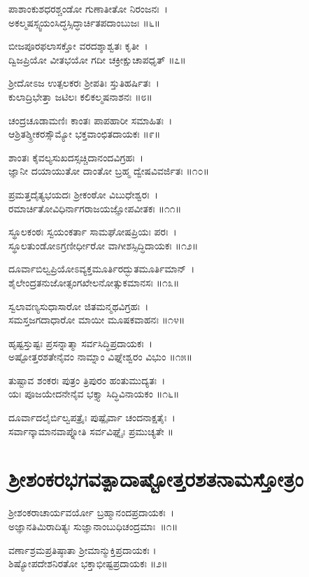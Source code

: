ಪಾಶಾಂಕುಶಧರಶ್ಚಂಡೋ ಗುಣಾತೀತೋ ನಿರಂಜನಃ~।\\
ಅಕಲ್ಮಷಸ್ಸ್ವಯಂಸಿದ್ಧಸ್ಸಿದ್ಧಾರ್ಚಿತಪದಾಂಬುಜಃ ॥೬॥

ಬೀಜಪೂರಫಲಾಸಕ್ತೋ ವರದಶ್ಶಾಶ್ವತಃ ಕೃತೀ~।\\
ದ್ವಿಜಪ್ರಿಯೋ ವೀತಭಯೋ ಗದೀ ಚಕ್ರೀಕ್ಷುಚಾಪಧೃತ್ ॥೭॥

ಶ್ರೀದೋಽಜ ಉತ್ಪಲಕರಃ ಶ್ರೀಪತಿಃ ಸ್ತುತಿಹರ್ಷಿತಃ~।\\
ಕುಲಾದ್ರಿಭೇತ್ತಾ ಜಟಿಲಃ ಕಲಿಕಲ್ಮಷನಾಶನಃ ॥೮॥

ಚಂದ್ರಚೂಡಾಮಣಿಃ ಕಾಂತಃ ಪಾಪಹಾರೀ ಸಮಾಹಿತಃ~।\\
ಆಶ್ರಿತಶ್ಶ್ರೀಕರಸ್ಸೌಮ್ಯೋ ಭಕ್ತವಾಂಛಿತದಾಯಕಃ ॥೯॥

ಶಾಂತಃ ಕೈವಲ್ಯಸುಖದಸ್ಸಚ್ಚಿದಾನಂದವಿಗ್ರಹಃ~।\\
ಜ್ಞಾನೀ ದಯಾಯುತೋ ದಾಂತೋ ಬ್ರಹ್ಮ ದ್ವೇಷವಿವರ್ಜಿತಃ ॥೧೦॥

ಪ್ರಮತ್ತದೈತ್ಯಭಯದಃ ಶ್ರೀಕಂಠೋ ವಿಬುಧೇಶ್ವರಃ~।\\
ರಮಾರ್ಚಿತೋವಿಧಿರ್ನಾಗರಾಜಯಜ್ಞೋಪವೀತಕಃ ॥೧೧॥

ಸ್ಥೂಲಕಂಠಃ ಸ್ವಯಂಕರ್ತಾ ಸಾಮಘೋಷಪ್ರಿಯಃ ಪರಃ~।\\
ಸ್ಥೂಲತುಂಡೋಽಗ್ರಣೀರ್ಧೀರೋ ವಾಗೀಶಸ್ಸಿದ್ಧಿದಾಯಕಃ ॥೧೨॥

ದೂರ್ವಾಬಿಲ್ವಪ್ರಿಯೋಽವ್ಯಕ್ತಮೂರ್ತಿರದ್ಭುತಮೂರ್ತಿಮಾನ್~।\\
ಶೈಲೇಂದ್ರತನುಜೋತ್ಸಂಗಖೇಲನೋತ್ಸುಕಮಾನಸಃ ॥೧೩॥

ಸ್ವಲಾವಣ್ಯಸುಧಾಸಾರೋ ಜಿತಮನ್ಮಥವಿಗ್ರಹಃ~।\\
ಸಮಸ್ತಜಗದಾಧಾರೋ ಮಾಯೀ ಮೂಷಕವಾಹನಃ ॥೧೪॥

ಹೃಷ್ಟಸ್ತುಷ್ಟಃ ಪ್ರಸನ್ನಾತ್ಮಾ ಸರ್ವಸಿದ್ಧಿಪ್ರದಾಯಕಃ~।\\
ಅಷ್ಟೋತ್ತರಶತೇನೈವಂ ನಾಮ್ನಾಂ ವಿಘ್ನೇಶ್ವರಂ ವಿಭುಂ ॥೧೫॥

ತುಷ್ಟಾವ ಶಂಕರಃ ಪುತ್ರಂ ತ್ರಿಪುರಂ ಹಂತುಮುದ್ಯತಃ~।\\
ಯಃ ಪೂಜಯೇದನೇನೈವ ಭಕ್ತ್ಯಾ ಸಿದ್ಧಿವಿನಾಯಕಂ ॥೧೬॥

ದೂರ್ವಾದಲೈರ್ಬಿಲ್ವಪತ್ರೈಃ ಪುಷ್ಪೈರ್ವಾ ಚಂದನಾಕ್ಷತೈಃ~।\\
ಸರ್ವಾನ್ಕಾಮಾನವಾಪ್ನೋತಿ ಸರ್ವವಿಘ್ನೈಃ ಪ್ರಮುಚ್ಯತೇ ॥

\section{ ಶ್ರೀಶಂಕರಭಗವತ್ಪಾದಾಷ್ಟೋತ್ತರಶತನಾಮಸ್ತೋತ್ರಂ}
ಶ್ರೀಶಂಕರಾಚಾರ್ಯವರ್ಯೋ  ಬ್ರಹ್ಮಾನಂದಪ್ರದಾಯಕಃ~।\\
ಅಜ್ಞಾನತಿಮಿರಾದಿತ್ಯಃ  ಸುಜ್ಞಾನಾಂಬುಧಿಚಂದ್ರಮಾಃ~॥೧॥

ವರ್ಣಾಶ್ರಮಪ್ರತಿಷ್ಠಾತಾ  ಶ್ರೀಮಾನ್ಮುಕ್ತಿಪ್ರದಾಯಕಃ ।\\
ಶಿಷ್ಯೋಪದೇಶನಿರತೋ ಭಕ್ತಾಭೀಷ್ಟಪ್ರದಾಯಕಃ ॥೨॥

